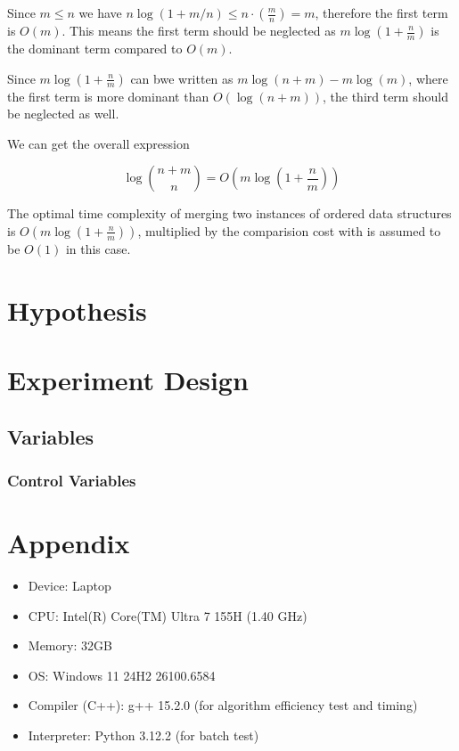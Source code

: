 \documentclass[12pt]{article}
\begin{document}
Since $m\le n$ we have $n\log(1+m/n)\le n\cdot(\frac{m}{n}) = m$, therefore the first term is $O(m)$. This means the first term should be neglected as $m\log(1+\frac{n}{m})$ is the dominant term compared to $O(m)$.

Since $m\log (1+\frac{n}{m})$ can bwe written as $m\log(n+m) - m\log(m)$, where the first term is more dominant than $O(\log (n+m))$, the third term should be neglected as well.

We can get the overall expression

\begin{equation}
    \boxed{\log \binom{n+m}{n} = O(m\log(1+\frac{n}{m}))}
\end{equation}

\begin{tcolorbox}[title = Theorem]
    The optimal time complexity of merging two instances of ordered data structures is $O(m\log(1+\frac{n}{m}))$, multiplied by the comparision cost with is assumed to be $O(1)$ in this case.
\end{tcolorbox}

\section{Hypothesis}

\section{Experiment Design}

\subsection{Variables}

\subsubsection{Control Variables}



\section*{Appendix}

\begin{tcolorbox}[title = Test environment]
    \begin{itemize}
        \item Device: Laptop
        \item CPU: Intel(R) Core(TM) Ultra 7 155H (1.40 GHz)
        \item Memory: 32GB
        \item OS: Windows 11 24H2 26100.6584
        \item Compiler (C++): g++ 15.2.0 (for algorithm efficiency test and timing)
        \item Interpreter: Python 3.12.2 (for batch test)
    \end{itemize}
\end{tcolorbox}
\end{document}
